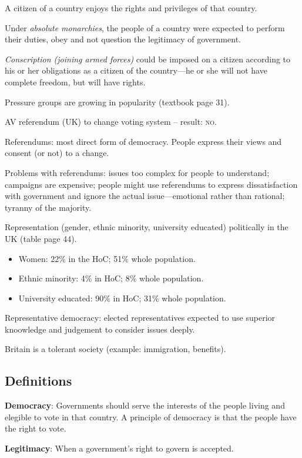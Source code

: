 \documentclass[12pt]{article}
\begin{document}
		A citizen of a country enjoys the rights and privileges of that country.
		
		Under \textit{absolute monarchies}, the people of a country were expected to perform their duties, obey and not question the legitimacy of government.
		
		\textit{Conscription (joining armed forces)} could be imposed on a citizen according to his or her obligations as a citizen of the country---he or she will not have complete freedom, but will have rights.
		
		Pressure groups are growing in popularity (textbook page 31).
		
		AV referendum (UK) to change voting system -- result: \textsc{no}.
		
		Referendums: most direct form of democracy.  People express their views and consent (or not) to a change.
		
		Problems with referendums: issues too complex for people to understand; campaigns are expensive; people might use referendums to express dissatisfaction with government and ignore the actual issue---emotional rather than rational; tyranny of the majority.
		
		Representation (gender, ethnic minority, university educated) politically in the UK (table page 44).
		\begin{itemize}
			\item{Women: 22\% in the HoC; 51\% whole population.}
			\item{Ethnic minority: 4\% in HoC; 8\% whole population.}
			\item{University educated: 90\% in HoC; 31\% whole population.}
		\end{itemize}
		
		Representative democracy: elected representatives expected to use superior knoowledge and judgement to consider issues deeply.
		
		Britain is a tolerant society (example: immigration, benefits).
		
				
		
		
	\subsection*{Definitions}

		\textbf{Democracy}: Governments should serve the interests of the people living and elegible to vote in that country.  A principle of democracy is that the people have the right to vote.

		\textbf{Legitimacy}: When a government's right to govern is accepted.
\end{document}
